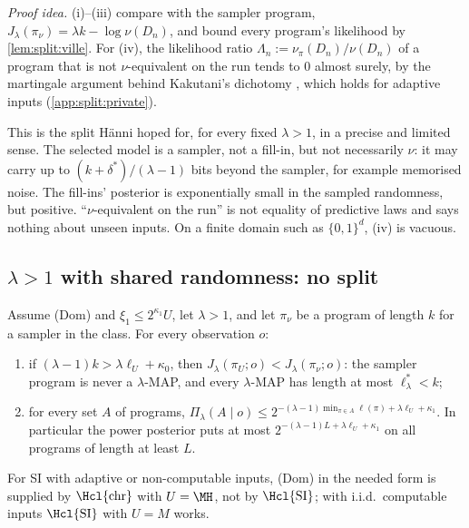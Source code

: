 \emph{Proof idea.} (i)--(iii) compare with the sampler program, $J_\lambda(\pi_\nu)=\lambda k-\log\nu(D_n)$, and bound every program's likelihood by \cref{lem:split:ville}. For (iv), the likelihood ratio $\Lambda_n:=\nu_\pi(D_n)/\nu(D_n)$ of a program that is not $\nu$-equivalent on the run tends to $0$ almost surely, by the martingale argument behind Kakutani's dichotomy \citep{kakutani1948equivalence}, which holds for adaptive inputs (\cref{app:split:private}).

\begin{remark}\label{rem:split:reading}
This is the split H\"anni hoped for, for every fixed $\lambda>1$, in a precise and limited sense. The selected model is a sampler, not a fill-in, but not necessarily $\nu$: it may carry up to $(k+\delta^*)/(\lambda-1)$ bits beyond the sampler, for example memorised noise. The fill-ins' posterior is exponentially small in the sampled randomness, but positive. ``$\nu$-equivalent on the run'' is not equality of predictive laws and says nothing about unseen inputs. On a finite domain such as $\{0,1\}^d$, (iv) is vacuous.
\end{remark}

\subsection{$\lambda>1$ with shared randomness: no split}\label{sec:split:shared}

\begin{theorem}\label{thm:split:shared}
Assume (Dom) and $\xi_1\le2^{\kappa_1}U$, let $\lambda>1$, and let $\pi_\nu$ be a program of length $k$ for a sampler in the class. For every observation $o$:
\begin{enumerate}[label=(\roman*)]
\item if $(\lambda-1)k>\lambda\ell_U+\kappa_0$, then $J_\lambda(\pi_U;o)<J_\lambda(\pi_\nu;o)$: the sampler program is never a $\lambda$-MAP, and every $\lambda$-MAP has length at most $\ell^*_\lambda<k$;
\item for every set $A$ of programs, $\Pi_\lambda(A\mid o)\le2^{-(\lambda-1)\min_{\pi\in A}\ell(\pi)+\lambda\ell_U+\kappa_1}$. In particular the power posterior puts at most $2^{-(\lambda-1)L+\lambda\ell_U+\kappa_1}$ on all programs of length at least $L$.
\end{enumerate}
For SI with adaptive or non-computable inputs, (Dom) in the needed form is supplied by $\Hcl{\mathrm{chr}}$ with $U=\MH$, not by $\Hcl{\mathrm{SI}}$; with i.i.d.\ computable inputs $\Hcl{\mathrm{SI}}$ with $U=M$ works.
\end{theorem}

